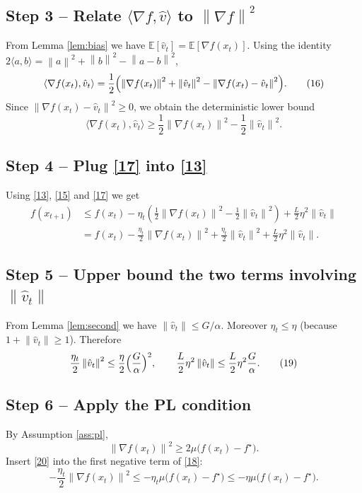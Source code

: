 \documentclass{article}
\newcommand{\EE}{\mathbb{E}}
\newcommand{\norm}[1]{\left\|#1\right\|}
\newcommand{\inner}[2]{\langle #1,#2\rangle}
\newcommand{\grad}{\nabla}
\begin{document}
\subsection*{Step 3 – Relate $\inner{\grad f}{\hat v}$ to $\norm{\grad f}^{2}$}
From Lemma \ref{lem:bias} we have $\EE[\hat v_{t}]=\EE[\grad f(x_{t})]$.  Using the
identity $2\inner{a}{b}= \norm{a}^{2}+\norm{b}^{2}-\norm{a-b}^{2}$,
\[
\inner{\grad f(x_{t})}{\hat v_{t}}
= \frac{1}{2}\Bigl(\norm{\grad f(x_{t})}^{2}
        +\norm{\hat v_{t}}^{2}
        -\norm{\grad f(x_{t})-\hat v_{t}}^{2}\Bigr).
\tag{16}
\]
Since $\norm{\grad f(x_{t})-\hat v_{t}}^{2}\ge0$, we obtain the deterministic
lower bound
\[
\inner{\grad f(x_{t})}{\hat v_{t}}
\ge \frac{1}{2}\norm{\grad f(x_{t})}^{2}
      -\frac{1}{2}\norm{\hat v_{t}}^{2}.
\tag{17}
\]

\subsection*{Step 4 – Plug \eqref{17} into \eqref{13}}
Using \eqref{13}, \eqref{15} and \eqref{17} we get
\[
\begin{aligned}
f(x_{t+1})
&\le f(x_{t})
   -\eta_{t}\!\left(\frac{1}{2}\norm{\grad f(x_{t})}^{2}
                     -\frac{1}{2}\norm{\hat v_{t}}^{2}\right)
   +\frac{L}{2}\eta^{2}\norm{\hat v_{t}}\\[2mm]
&= f(x_{t})
   -\frac{\eta_{t}}{2}\norm{\grad f(x_{t})}^{2}
   +\frac{\eta_{t}}{2}\norm{\hat v_{t}}^{2}
   +\frac{L}{2}\eta^{2}\norm{\hat v_{t}}.
\tag{18}
\end{aligned}
\]

\subsection*{Step 5 – Upper bound the two terms involving $\norm{\hat v_{t}}$}
From Lemma \ref{lem:second} we have $\norm{\hat v_{t}}\le G/\alpha$.
Moreover $\eta_{t}\le\eta$ (because $1+\norm{\hat v_{t}}\ge1$).  Therefore
\[
\frac{\eta_{t}}{2}\norm{\hat v_{t}}^{2}
\le \frac{\eta}{2}\Bigl(\frac{G}{\alpha}\Bigr)^{2},
\qquad
\frac{L}{2}\eta^{2}\norm{\hat v_{t}}
\le \frac{L}{2}\eta^{2}\frac{G}{\alpha}.
\tag{19}
\]

\subsection*{Step 6 – Apply the PL condition}
By Assumption \ref{ass:pl},
\[
\norm{\grad f(x_{t})}^{2}\ge 2\mu\bigl(f(x_{t})-f^{\star}\bigr).
\tag{20}
\]
Insert \eqref{20} into the first negative term of \eqref{18}:
\[
-\frac{\eta_{t}}{2}\norm{\grad f(x_{t})}^{2}
\le -\eta_{t}\mu\bigl(f(x_{t})-f^{\star}\bigr)
\le -\eta\mu\bigl(f(x_{t})-f^{\star}\bigr).
\tag{21}
\]
\end{document}
